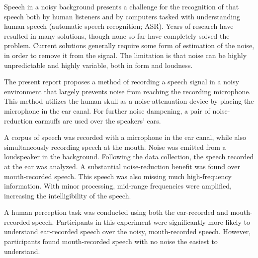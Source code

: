 % 


Speech in a noisy background presents a challenge for the recognition of that speech both by human listeners and by computers tasked with understanding human speech (automatic speech recognition; ASR).  Years of research have resulted in many solutions, though none so far have completely solved the problem.  Current solutions generally require some form of estimation of the noise, in order to remove it from the signal. The limitation is that noise can be highly unpredictable and highly variable, both in form and loudness.

The present report proposes a method of recording a speech signal in a noisy environment that largely prevents noise from reaching the recording microphone.  This method utilizes the human skull as a noise-attenuation device by placing the microphone in the ear canal.  For further noise dampening, a pair of noise-reduction earmuffs are used over the speakers' ears.

A corpus of speech was recorded with a microphone in the ear canal, while also simultaneously recording speech at the mouth.  Noise was emitted from a loudspeaker in the background.  Following the data collection, the speech recorded at the ear was analyzed.  A substantial noise-reduction benefit was found over mouth-recorded speech.  This speech was also missing much high-frequency information.  With minor processing, mid-range frequencies were amplified, increasing the intelligibility of the speech.

A human perception task was conducted using both the ear-recorded and mouth-recorded speech.  Participants in this experiment were significantly more likely to understand ear-recorded speech over the noisy, mouth-recorded speech.  However, participants found mouth-recorded speech with no noise the easiest to understand.

